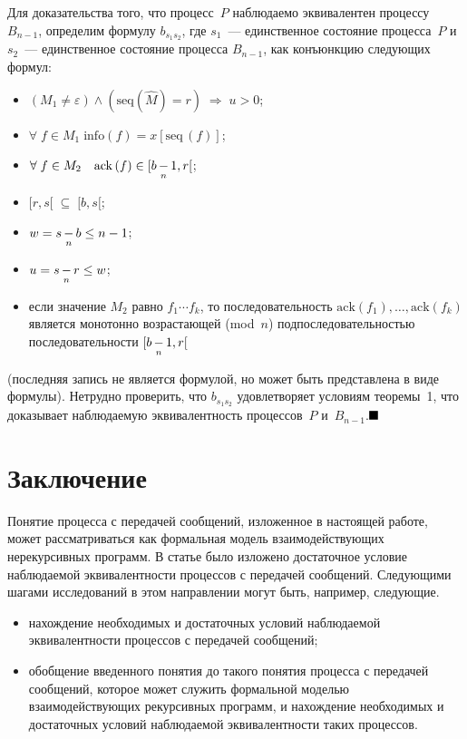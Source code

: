 \begin{multicols}{2}
Для доказательства того, что процесс~$P$ наблюдаемо эквивалентен
процессу~$B_{n-1}$, определим формулу $b_{s_1s_2}$, где
$s_1$~--- единственное состояние процесса~$P$ и
$s_2$~--- единственное состояние процесса $B_{n-1}$,
как конъюнкцию следующих формул:
\begin{itemize}
\item $(M_1\neq \varepsilon)\wedge \left(\mathrm{seq}\left(\hat M\right)=r\right)
    \;\Rightarrow\;u>0$;
\item $\forall\; f\in M_1\;  \mathrm{info}\left(f\right)=x[\mathrm{seq}\,(f)]$;
\item $\forall\; f\in M_2\quad \mathrm{ack}\left(f\right)\hm\in [b\modm{n}1,r[$;
\item $[r,s[\;\subseteq \;[b,s[$;
\item $w=s\mathop{-}\limits_{n}b\leq n-1$;
\item $u=s\mathop{-}\limits_{n}r\leq w$;
\item  если значение
    $M_2$ равно $f_1\cdots f_k$,
то последовательность $\mathrm{ack}\left(f_1\right),\ldots , \mathrm{ack}\left(f_k\right)$
является монотонно возрастающей (mod~$n$) подпоследовательностью
последовательности $[b\mathop{-}\limits_{n}1,r[$
\end{itemize}
(последняя запись не является формулой, но может быть представлена в виде формулы).
Нетрудно проверить, что $b_{s_1s_2}$ удовлетворяет условиям теоремы~1,
что доказывает наблюдаемую эквивалентность процессов~$P$ и~$B_{n-1}$.\hfill$\blackbox$


  \section{Заключение}

Понятие процесса с передачей сообщений, изложенное в настоящей работе,
может рассматриваться как формальная модель взаимодействующих нерекурсивных программ.
В статье было изложено достаточное условие наблюдаемой эквива\-лент\-ности процессов
с передачей сообщений. Следующими шагами исследований в этом направлении могут быть, например, следующие.
\begin{itemize}
\item нахождение необходимых и достаточных условий наблюдаемой эквивалентности процессов
с передачей сообщений;
\item обобщение введенного понятия до такого понятия процесса с передачей
сообщений, которое может служить формальной моделью
взаимодействующих рекурсивных программ, и на\-хож\-де\-ние необходимых и достаточных
условий наблюдаемой эквивалентности таких процессов.
\end{itemize}


\end{multicols}
